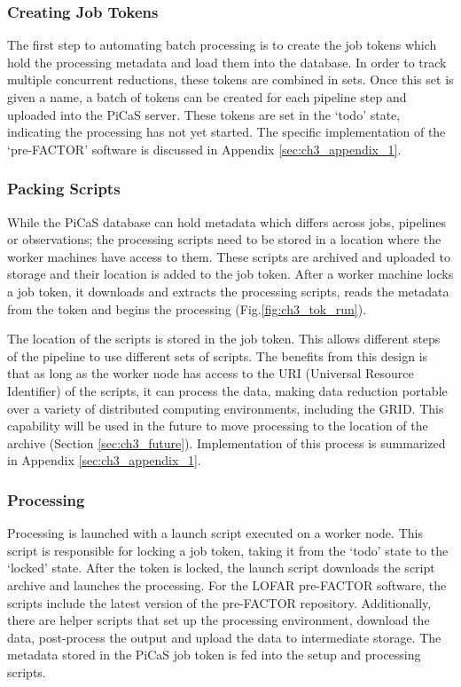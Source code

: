 \subsubsection{Creating Job Tokens}\label{sec:ch3_create_tokens}

The first step to automating batch processing is to create the job tokens which hold the processing metadata and load them into the database. In order to track multiple concurrent reductions, these tokens are combined in sets. Once this set is given a name, a batch of tokens can be created for each pipeline step and uploaded into the PiCaS server. These tokens are set in the `todo' state, indicating the processing has not yet started. The specific implementation of the `pre-FACTOR' software is discussed in Appendix \ref{sec:ch3_appendix_1}.


\subsubsection{Packing Scripts}\label{sect:ch3_scripts}

While the PiCaS database can hold metadata which differs across jobs, pipelines or observations; the processing scripts need to be stored in a location where the worker machines have access to them. These scripts are archived and uploaded to storage and their location is added to the job token. After a worker machine locks a job token, it downloads and extracts the processing scripts, reads the metadata from the token and begins the processing (Fig.\ref{fig:ch3_tok_run}).

The location of the scripts is stored in the job token. This allows different steps of the pipeline to use different sets of scripts. The benefits from this design is that as long as the worker node has access to the URI (Universal Resource Identifier) of the scripts, it can process the data, making data reduction portable over a variety of distributed computing environments, including the GRID. This capability will be used in the future to move processing to the location of the archive (Section \ref{sec:ch3_future}). Implementation of this process is summarized in Appendix \ref{sec:ch3_appendix_1}. 


\subsubsection{Processing}

Processing is launched with a launch script executed on a worker node. This script is responsible for locking a job token, taking it from the `todo' state to the `locked' state. After the token is locked, the launch script downloads the script archive and launches the processing. For the LOFAR pre-FACTOR software, the scripts include the latest version of the pre-FACTOR repository. Additionally, there are helper scripts that set up the processing environment, download the data, post-process the output and upload the data to intermediate storage. The metadata stored in the PiCaS job token is fed into the setup and processing scripts. 

